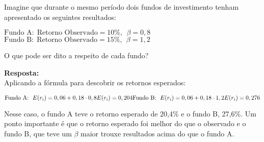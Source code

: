 Imagine que durante o mesmo período dois fundos de investimento tenham apresentado os seguintes resultados:

\singlespacing
\begin{center}
	$\text{Fundo A:} \ \ \text{Retorno Observado} = 10\%, \ \ \beta = 0,8$
	\\
	$\text{Fundo B:} \ \ \text{Retorno Observado} = 15\%, \ \ \beta = 1,2$
\end{center}

\singlespacing

O que pode ser dito a respeito de cada fundo?

\singlespacing

\textbf{Resposta:}
\\
Aplicando a fórmula para descobrir os retornos esperados:

\begin{equation}
\text{Fundo A:} \ \ E(r_{i}) = 0,06 + 0,18 \cdot 0,8
$$\\$$
E(r_{i}) = 0,204
$$\\$$
\text{Fundo B:} \ \ E(r_{i}) = 0,06 + 0,18 \cdot 1,2
$$\\$$
E(r_{i}) = 0,276
\end{equation}

Nesse caso, o fundo A teve o retorno esperado de 20,4\% e o fundo B, 27,6\%. Um ponto importante é que o retorno esperado foi melhor do que o observado e o fundo B, que teve um $\beta$ maior trouxe resultados acima do que o fundo A.